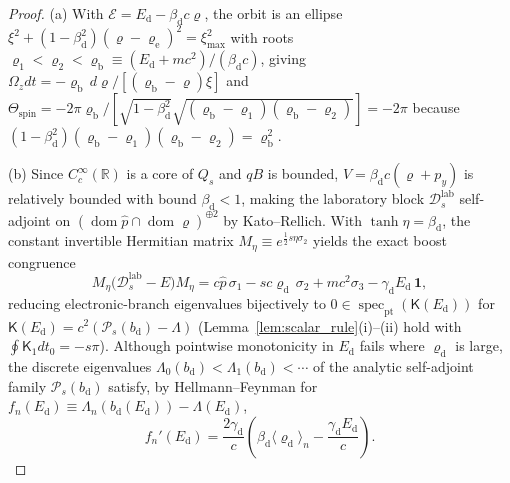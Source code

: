 \documentclass[aps,prd,onecolumn,tightenlines,nofootinbib,notitlepage,10pt,floatfix]{revtex4-2}
\theoremstyle{indentedtheorem}
\begin{document}
\begin{proof}
(a) With $\mathcal{E}=E_\text{d}-\beta_\text{d}c\varrho$, the orbit is an ellipse $\xi^2+(1-\beta_\text{d}^2)(\varrho-\varrho_\text{e})^2=\xi_{\max}^2$ with roots $\varrho_1<\varrho_2<\varrho_\text{b}\equiv(E_\text{d}+mc^2)/(\beta_\text{d}c)$, giving $\Omega_z dt=-\varrho_\text{b}\,d\varrho/[(\varrho_\text{b}-\varrho)\xi]$ and $\Theta_\text{spin}=-2\pi\varrho_\text{b}/[\sqrt{1-\beta_\text{d}^2}\sqrt{(\varrho_\text{b}-\varrho_1)(\varrho_\text{b}-\varrho_2)}]=-2\pi$ because $(1-\beta_\text{d}^2)(\varrho_\text{b}-\varrho_1)(\varrho_\text{b}-\varrho_2)=\varrho_\text{b}^2$.

(b) Since $C_c^\infty(\mathbb{R})$ is a core of $Q_s$ and $qB$ is bounded, $V=\beta_\text{d}c(\varrho+p_y)$ is relatively bounded with bound $\beta_\text{d}<1$, making the laboratory block $\mathcal{D}_s^\text{lab}$ self-adjoint on $(\operatorname{dom}\hat{p}\cap\operatorname{dom}\varrho)^{\oplus 2}$ by Kato--Rellich. With $\tanh\eta=\beta_\text{d}$, the constant invertible Hermitian matrix $M_\eta\equiv e^{\frac{1}{2}s\eta\sigma_2}$ yields the exact boost congruence~\citep{Lukose2007Novel}
\begin{equation}
    M_\eta\big(\mathcal{D}_s^\text{lab}-E\big)M_\eta = c\hat{p}\,\sigma_1 - sc\varrho_\text{d}\,\sigma_2 + mc^2\sigma_3 - \gamma_\text{d}E_\text{d}\,\mathbf{1} ,
    \label{eq:boost_congruence}
\end{equation}
reducing electronic-branch eigenvalues bijectively to $0\in\operatorname{spec}_\text{pt}(\mathsf{K}(E_\text{d}))$ for $\mathsf{K}(E_\text{d})=c^2(\mathcal{P}_s(b_\text{d})-\Lambda)$ (Lemma~\ref{lem:scalar_rule}(i)--(ii) hold with $\oint\mathsf{K}_1 dt_0=-s\pi$). Although pointwise monotonicity in $E_\text{d}$ fails where $\varrho_\text{d}$ is large, the discrete eigenvalues $\Lambda_0(b_\text{d})<\Lambda_1(b_\text{d})<\cdots$ of the analytic self-adjoint family $\mathcal{P}_s(b_\text{d})$ satisfy, by Hellmann--Feynman for $f_n(E_\text{d})\equiv\Lambda_n(b_\text{d}(E_\text{d}))-\Lambda(E_\text{d})$,
\begin{equation}
    f_n'(E_\text{d}) = \frac{2\gamma_\text{d}}{c}\!\left(\beta_\text{d}\langle\varrho_\text{d}\rangle_n - \frac{\gamma_\text{d}E_\text{d}}{c}\right) .
    \label{eq:hf_crossed}
\end{equation}

\end{proof}
\end{document}
